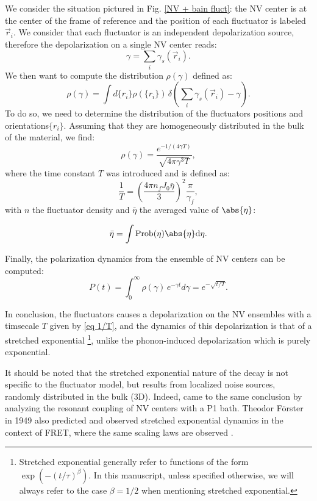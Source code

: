 \documentclass[a4paper, 11pt]{report}
\begin{document}
We consider the situation pictured in Fig. \ref{NV + bain fluct}: the NV center is at the center of the frame of reference and the position of each fluctuator is labeled $\vec{r}_i$. We consider that each fluctuator is an independent depolarization source, therefore the depolarization on a single NV center reads: 
\begin{equation}
\gamma=\sum_i \gamma_s(\vec{r}_i).
\end{equation}
We then want to compute the distribution $\rho(\gamma)$ defined as:
\begin{equation}
\rho(\gamma)=\int d\{r_i\} \rho(\{r_i\})\, \delta \left( \sum_i \gamma_s(\vec{r}_i) - \gamma \right).
\end{equation}
To do so, we need to determine the distribution of the fluctuators positions and orientations$\{r_i\}$. Assuming that they are homogeneously distributed in the bulk of the material, we find:
\begin{equation}
\rho(\gamma)=\frac{e^{-1/(4\gamma T)}}{\sqrt{4\pi \gamma^3 T}},
\end{equation}
where the time constant $T$ was introduced and is defined as:
\begin{equation}
\frac{1}{T}=\left(\frac{4\pi n_fJ_0\bar \eta}{3}\right)^2 \frac{\pi}{\gamma_f},
\label{eq 1/T}
\end{equation}
with $n$ the fluctuator density and $\bar \eta$ the averaged value of $\abs{\eta}$: 

\begin{equation}
\bar \eta = \int \rm{Prob}(\eta) \abs{\eta} d\eta.
\end{equation}

Finally, the polarization dynamics from the ensemble of NV centers can be computed:
\begin{equation}
P(t)=\int_0^\infty \rho(\gamma)\, e^{-\gamma t}d\gamma= e^{-\sqrt{t/T}}.
\end{equation}

In conclusion, the fluctuators causes a depolarization on the NV ensembles with a timsecale $T$ given by \ref{eq 1/T}, and the dynamics of this depolarization is that of a stretched exponential \footnote{Stretched exponential generally refer to functions of the form $\exp(-(t/\tau)^{\beta})$. In this manuscript, unless specified otherwise, we will always refer to the case $\beta=1/2$ when mentioning stretched exponential.}, unlike the phonon-induced depolarization which is purely exponential. 

It should be noted that the stretched exponential nature of the decay is not specific to the fluctuator model, but results from localized noise sources, randomly distributed in the bulk (3D). Indeed, \citep{hall2016detection} came to the same conclusion by analyzing the resonant coupling of NV centers with a P1 bath. Theodor Förster in 1949 also predicted and observed stretched exponential dynamics in the context of FRET, where the same scaling laws are observed \citep{forster1949experimentelle}.
\end{document}
